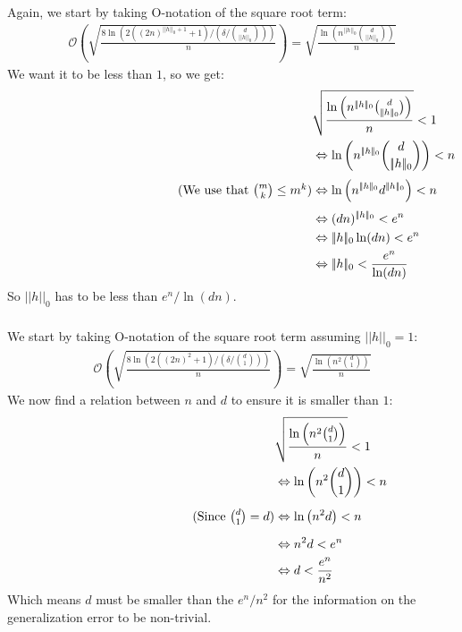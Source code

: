 \documentclass[a4paper]{article}
\newcommand{\comment}[1]{%
  \text{\phantom{(#1)}} \tag{#1}}
\def\dpip{|\!|}
\begin{document}
\subsubsection{}
Again, we start by taking O-notation of the square root term:
\begin{align*}
  \mathcal{O}(\sqrt{\frac{8\ln(2((2n)^{\dpip h\dpip_0+1}+1)/(\delta/\binom{d}{\dpip h\dpip_0}))}{n}}) = \sqrt{\frac{\ln(n^{\dpip h\dpip_0}\binom{d}{\dpip h\dpip_0})}{n}}
\end{align*}
We want it to be less than $1$, so we get:
\begin{align*}
  &\sqrt{\frac{\ln\left(n^{\dpip h\dpip_0}\binom{d}{\dpip h\dpip_0}\right)}{n}} < 1 \\
  &\Leftrightarrow \ln\left(n^{\dpip h\dpip_0}\binom{d}{\dpip h\dpip_0}\right) < n \\
  \comment{We use that $\binom{m}{k}\leq m^k$}  &\Leftrightarrow \ln\left(n^{\dpip h\dpip_0}d^{\dpip h\dpip_0}\right) < n \\
                                                &\Leftrightarrow (dn)^{\dpip h\dpip_0} < e^n \\
                                                &\Leftrightarrow \dpip h\dpip_0 \ln(dn) < e^n \\
  &\Leftrightarrow \dpip h\dpip_0 < \frac{e^n}{\ln(dn)}
\end{align*}
So $\dpip h\dpip_0$ has to be less than $e^n/\ln(dn)$.

\subsubsection{}
We start by taking O-notation of the square root term assuming $\dpip h\dpip_0=1$:
\begin{align*}
  \mathcal{O}(\sqrt{\frac{8\ln(2((2n)^{2}+1)/(\delta/\binom{d}{1}))}{n}}) = \sqrt{\frac{\ln(n^{2}\binom{d}{1})}{n}}
\end{align*}
We now find a relation between $n$ and $d$ to ensure it is smaller than $1$:
\begin{align*}
  &\sqrt{\frac{\ln\left(n^{2}\binom{d}{1}\right)}{n}} < 1 \\
  &\Leftrightarrow \ln\left(n^{2}\binom{d}{1}\right) < n \\
  \comment{Since $\binom{d}{1}=d$}  &\Leftrightarrow \ln\left(n^{2}d\right) < n \\
                                                &\Leftrightarrow n^2d < e^n \\
                                                &\Leftrightarrow d < \frac{e^n}{n^2}
\end{align*}
Which means $d$ must be smaller than the $e^n/n^2$ for the information on the generalization error to be non-trivial.
\end{document}
